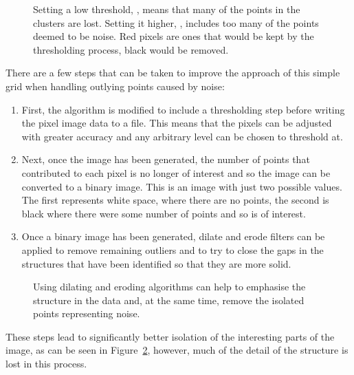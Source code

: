 \begin{figure}[tbh]
	\caption[Effect of threshold value on clusters identified.]{Setting a low
		threshold, , means that many of the
		points in the clusters are lost. Setting it higher,
		, includes too many of the points
		deemed to be noise. Red pixels are ones that would be kept by the
		thresholding process, black would be removed.}\label{fig:grid-noise}
\end{figure}

There are a few steps that can be taken to improve the approach of this simple
grid when handling outlying points caused by noise:

\begin{enumerate}

	\item First, the algorithm is modified to include a thresholding step
		before writing the pixel image data to a file. This means that the
		pixels can be adjusted with greater accuracy and any arbitrary level
		can be chosen to threshold at.

	\item Next, once the image has been generated, the number of points that
		contributed to each pixel is no longer of interest and so the image can
		be converted to a binary image. This is an image with just two possible
		values. The first represents white space, where there are no points,
		the second is black where there were some number of points and so is of
		interest.

	\item Once a binary image has been generated, dilate and erode filters can
		be applied to remove remaining outliers and to try to close the gaps in
		the structures that have been identified so that they are more solid.

\end{enumerate}

\begin{figure}[tbh]
	\centering

	\caption[Closing algorithm to identify clusters.]{Using dilating and
		eroding algorithms can help to emphasise the structure in the
		data and, at the same time, remove the isolated points representing
		noise.}\label{fig:grid-threshold-close}
\end{figure}

These steps lead to significantly better isolation of the interesting parts of
the image, as can be seen in Figure~\ref{fig:grid-threshold-close}, however,
much of the detail of the structure is lost in this process.
